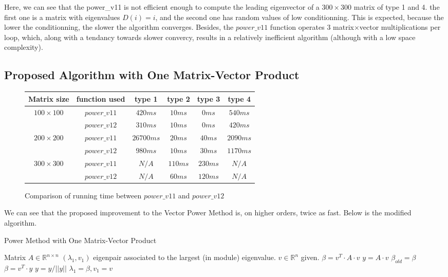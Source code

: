 \documentclass{article}
\begin{document}
    Here, we can see that the power\_v11 is not efficient enough to compute the leading eigenvector of a $300\times300$ matrix of type 1 and 4.
    the first one is a matrix with eigenvalues $D(i) = i$, and the second one has random values of low conditionning. This is expected, because the lower the conditionning, the slower the algorithm converges.
    Besides, the $power\_v11$ function operates $3$ matrix$\times$vector multiplications per loop, which, along with a tendancy towards slower convercy, results in a relatively inefficient algorithm (although with a low space complexity).

\subsection{Proposed Algorithm with One Matrix-Vector Product}

\begin{figure}[H]
\begin{table}[H]
\centering
    \begin{tabular}{cccccc}
        \toprule
        Matrix size & function used & type 1 & type 2 & type 3 & type 4\\
        \midrule
        \midrule
        \multirow{2}{*}{$100 \times 100$} & $power\_v11$ & $420ms$ & $10ms$ & $0ms$ & $540ms$\\
        & $power\_v12$ & $310ms$ & $10ms$ & $0ms$ & $420ms$\\
        \midrule
        \multirow{2}{*}{$200 \times 200$} & $power\_v11$ & $26700ms$ & $20ms$ & $40 ms$ & $2090ms$ \\
        & $power\_v12$ & $980ms$ & $10ms$ & $30ms$ & $1170ms$ \\
        \midrule
        \multirow{2}{*}{$300 \times 300$} & $power\_v11$ & $N/A$ & $110ms$ & $230ms$ & $N/A$ \\
        & $power\_v12$ & $N/A$ & $60ms$ & $120ms$ & $N/A$ \\
        \bottomrule
    \end{tabular}
\end{table}

    \caption{Comparison of running time between $power\_v11$ and $power\_v12$}
\end{figure}

    We can see that the proposed improvement to the Vector Power Method is, on higher orders, twice as fast. Below is the modified algorithm.

\begin{algorithm}[H]
\caption{Power Method with One Matrix-Vector Product}
\begin{algorithmic}[1]
    \State Matrix $A \in \mathbb{R}^{n \times n}$
    \State$(\lambda_1, v_1)$ eigenpair associated to the largest (in module) eigenvalue.
    \State$v \in \mathbb{R}^n$ given.
    \State$\beta = v^T\cdot A \cdot v$
    \Repeat
    \State$y = A \cdot  v$
    \State$\beta_{old} = \beta$
    \State$\beta = v^T \cdot y$
    \State$y = y/||y||$
    \State$\lambda_1 = \beta, v_1 = v$
\end{algorithmic}
\end{algorithm}
\end{document}
